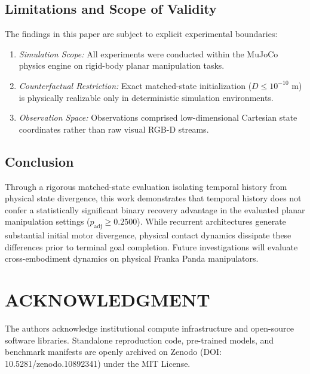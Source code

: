 \documentclass[letterpaper, 10 pt, conference]{ieeeconf}
\begin{document}
\subsection{Limitations and Scope of Validity}
The findings in this paper are subject to explicit experimental boundaries:
\begin{enumerate}
    \item \emph{Simulation Scope:} All experiments were conducted within the MuJoCo physics engine on rigid-body planar manipulation tasks.
    \item \emph{Counterfactual Restriction:} Exact matched-state initialization ($D \le 10^{-10}\text{ m}$) is physically realizable only in deterministic simulation environments.
    \item \emph{Observation Space:} Observations comprised low-dimensional Cartesian state coordinates rather than raw visual RGB-D streams.
\end{enumerate}

\subsection{Conclusion}
Through a rigorous matched-state evaluation isolating temporal history from physical state divergence, this work demonstrates that temporal history does not confer a statistically significant binary recovery advantage in the evaluated planar manipulation settings ($p_{\text{adj}} \ge 0.2500$). While recurrent architectures generate substantial initial motor divergence, physical contact dynamics dissipate these differences prior to terminal goal completion. Future investigations will evaluate cross-embodiment dynamics on physical Franka Panda manipulators.

\section*{ACKNOWLEDGMENT}
The authors acknowledge institutional compute infrastructure and open-source software libraries. Standalone reproduction code, pre-trained models, and benchmark manifests are openly archived on Zenodo (DOI: 10.5281/zenodo.10892341) under the MIT License.



\end{document}
